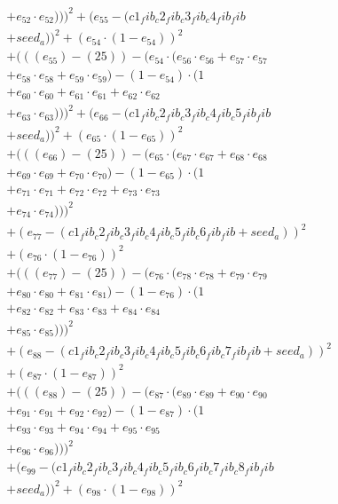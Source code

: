\documentclass[10pt, a4paper]{article}
\begin{document}
\begin{small}
\begin{align*}
& + e_{52} \cdot e_{52})))^{2} + (e_{55} - (c1_fib_c2_fib_c3_fib_c4_fib_fib \\
& + seed_a))^{2} + (e_{54} \cdot (1 - e_{54}))^{2} \\
& + (((e_{55}) - (25)) - (e_{54} \cdot (e_{56} \cdot e_{56} + e_{57} \cdot e_{57} \\
& + e_{58} \cdot e_{58} + e_{59} \cdot e_{59}) - (1 - e_{54}) \cdot (1 \\
& + e_{60} \cdot e_{60} + e_{61} \cdot e_{61} + e_{62} \cdot e_{62} \\
& + e_{63} \cdot e_{63})))^{2} + (e_{66} - (c1_fib_c2_fib_c3_fib_c4_fib_c5_fib_fib \\
& + seed_a))^{2} + (e_{65} \cdot (1 - e_{65}))^{2} \\
& + (((e_{66}) - (25)) - (e_{65} \cdot (e_{67} \cdot e_{67} + e_{68} \cdot e_{68} \\
& + e_{69} \cdot e_{69} + e_{70} \cdot e_{70}) - (1 - e_{65}) \cdot (1 \\
& + e_{71} \cdot e_{71} + e_{72} \cdot e_{72} + e_{73} \cdot e_{73} \\
& + e_{74} \cdot e_{74})))^{2} \\
& + (e_{77} - (c1_fib_c2_fib_c3_fib_c4_fib_c5_fib_c6_fib_fib + seed_a))^{2} \\
& + (e_{76} \cdot (1 - e_{76}))^{2} \\
& + (((e_{77}) - (25)) - (e_{76} \cdot (e_{78} \cdot e_{78} + e_{79} \cdot e_{79} \\
& + e_{80} \cdot e_{80} + e_{81} \cdot e_{81}) - (1 - e_{76}) \cdot (1 \\
& + e_{82} \cdot e_{82} + e_{83} \cdot e_{83} + e_{84} \cdot e_{84} \\
& + e_{85} \cdot e_{85})))^{2} \\
& + (e_{88} - (c1_fib_c2_fib_c3_fib_c4_fib_c5_fib_c6_fib_c7_fib_fib + seed_a))^{2} \\
& + (e_{87} \cdot (1 - e_{87}))^{2} \\
& + (((e_{88}) - (25)) - (e_{87} \cdot (e_{89} \cdot e_{89} + e_{90} \cdot e_{90} \\
& + e_{91} \cdot e_{91} + e_{92} \cdot e_{92}) - (1 - e_{87}) \cdot (1 \\
& + e_{93} \cdot e_{93} + e_{94} \cdot e_{94} + e_{95} \cdot e_{95} \\
& + e_{96} \cdot e_{96})))^{2} \\
& + (e_{99} - (c1_fib_c2_fib_c3_fib_c4_fib_c5_fib_c6_fib_c7_fib_c8_fib_fib \\
& + seed_a))^{2} + (e_{98} \cdot (1 - e_{98}))^{2} \\

\end{align*}
\end{small}
\end{document}
